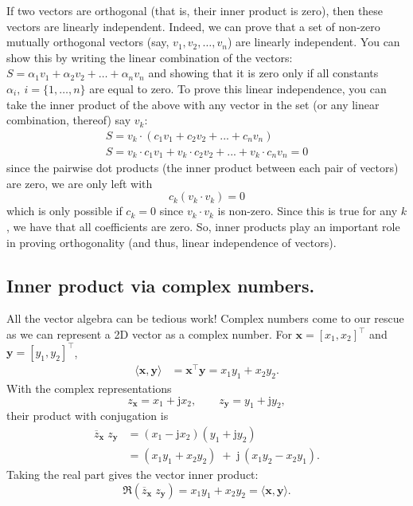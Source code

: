 \documentclass{ee102_notes}
\begin{document}
If two vectors are orthogonal (that is, their inner product is zero), then these vectors are linearly independent. Indeed, we can prove that a set of non-zero mutually orthogonal vectors (say, $v_1, v_2, \ldots, v_n$) are linearly independent. You can show this by writing the linear combination of the vectors: $
S = \alpha_1 v_1 + \alpha_2 v_2 + \ldots + \alpha_n v_n$ and showing that it is zero only if all constants $\alpha_i, \: i = \{1, \ldots, n\}$ are equal to zero. To prove this linear independence, you can take the inner product of the above with any vector in the set (or any linear combination, thereof) say $v_k$:
\begin{align*}
S = v_k \cdot (c_1v_1 + c_2v_2 + ... + c_nv_n)\\
S = v_k \cdot c_1v_1 + v_k \cdot c_2v_2 + ... + v_k \cdot c_nv_n = 0
\end{align*}
since the pairwise dot products (the inner product between each pair of vectors) are zero, we are only left with
\[
c_k (v_k \cdot v_k) = 0
\]
which is only possible if $c_k = 0$ since $v_k \cdot v_k$ is non-zero. Since this is true for any $k$, we have that all coefficients are zero. So, inner products play an important role in proving orthogonality (and thus, linear independence of vectors). 
\subsection{Inner product via complex numbers.}
All the vector algebra can be tedious work! Complex numbers come to our rescue as we can represent a 2D vector as a complex number. For $\mathbf{x}=[x_1,x_2]^{\top}$ and $\mathbf{y}=[y_1,y_2]^{\top}$,
\begin{align*}
\langle \mathbf{x},\mathbf{y}\rangle
&= \mathbf{x}^{\top}\mathbf{y}
= x_1y_1+x_2y_2 .
\end{align*}
With the complex representations
\[
z_{\mathbf{x}}=x_1+\mathrm{j}x_2,\qquad
z_{\mathbf{y}}=y_1+\mathrm{j}y_2,
\]
their product with conjugation is
\begin{align*}
\overline{z}_{\mathbf{x}}\;z_{\mathbf{y}}
&=(x_1-\mathrm{j}x_2)(y_1+\mathrm{j}y_2) \\
&=(x_1y_1+x_2y_2)\;+\;\mathrm{j}\,(x_1y_2 - x_2y_1).
\end{align*}
Taking the real part gives the vector inner product:
\[
\Re\!\left(\overline{z}_{\mathbf{x}}\;z_{\mathbf{y}}\right)=x_1y_1+x_2y_2
=\langle \mathbf{x},\mathbf{y}\rangle .
\]
\end{document}
